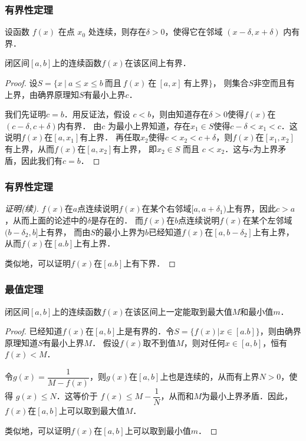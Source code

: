 \documentclass[14pt,notheorems,leqno,xcolor={rgb}]{beamer} %
\begin{document}
\begin{frame}%
\frametitle{有界性定理}
\small
\begin{lemma*}
设函数 $f(x)$ 在点 $x_0$ 处连续，则存在$\delta>0$，使得它在邻域 $(x-\delta,x+\delta)$ 内有界．
\end{lemma*}
\pause
\begin{theorem*}
闭区间$[a,b]$上的连续函数$f(x)$在该区间上有界．
\end{theorem*}
\pause
\begin{proof}
设$S=\{x\ |\ a\le x \le b\ \text{而且}\ f(x)\ \text{在}\ [a,x]\ \text{有上界}\}$，
则集合$S$非空而且有上界，由确界原理知$S$有最小上界$c$．
\par
我们先证明$c=b$．用反证法，假设 $c<b$，则由知道存在$\delta>0$使得$f(x)$在$(c-\delta,c+\delta)$内有界．
由$c$ 为最小上界知道，存在$x_1\in S$使得$c-\delta<x_1<c$．这说明$f(x)$在$[a,x_1]$有上界．
再任取$x_2$使得$c<x_2<c+\delta$，则$f(x)$在$[x_1,x_2]$有上界，从而$f(x)$在$[a,x_2]$有上界，
即$x_2\in S$ 而且 $c<x_2$．这与$c$为上界矛盾，因此我们有$c=b$．
\end{proof}
\end{frame}

\begin{frame}
\frametitle{有界性定理}
\small
\begin{proof}[证明(续)]
$f(x)$在$a$点连续说明$f(x)$在某个右邻域$[a,a+\delta_1)$上有界，因此$c>a$，从而上面的论述中的$\delta$是存在的．
而$f(x)$在$b$点连续说明$f(x)$在某个左邻域$(b-\delta_2,b]$上有界，
而由$S$的最小上界为$b$已经知道$f(x)$在$[a,b-\delta_2]$上有上界，从而$f(x)$在$[a.b]$上有上界．
\par
类似地，可以证明$f(x)$在$[a.b]$上有下界．
\end{proof}
\end{frame}

\begin{frame}
\frametitle{最值定理}
\small
\begin{theorem*}
闭区间$[a,b]$上的连续函数$f(x)$在该区间上一定能取到最大值$M$和最小值$m$．
\end{theorem*}
\pause
\begin{proof}
已经知道$f(x)$在$[a,b]$上是有界的．令$S=\{f(x)|x\in[a.b]\}$，则由确界原理知道$S$有最小上界$M$．
假设$f(x)$取不到值$M$，则对任何$x\in[a,b]$，恒有$f(x)<M$．
\par
令$g(x)=\dfrac1{M-f(x)}$，则$g(x)$在$[a,b]$上也是连续的，从而有上界$N>0$，使得 $g(x)\le N$．这等价于
$f(x)\le M-\dfrac1N$，从而和$M$为最小上界矛盾．因此，$f(x)$在$[a,b]$上可以取到最大值$M$．
\par
类似地，可以证明$f(x)$在$[a,b]$上可以取到最小值$m$．
\end{proof}
\end{frame}
\end{document}
